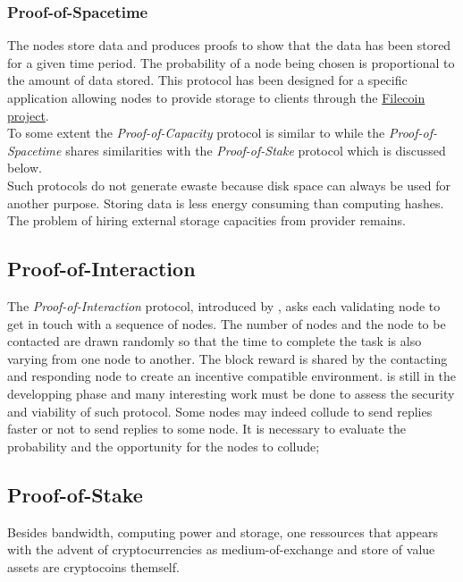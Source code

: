 \subsubsection{Proof-of-Spacetime}
The nodes store data and produces proofs to show that the data has been stored for a given time period. The probability of a node being chosen is proportional to the amount of data stored. This protocol has been designed for a specific application allowing nodes to provide storage to clients through the \href{https://filecoin.io/}{Filecoin project}.\\

\noindent To some extent the \textit{Proof-of-Capacity} protocol is similar to \PoW while the \textit{Proof-of-Spacetime} shares similarities with the \textit{Proof-of-Stake} protocol which is discussed below.\\

\noindent Such protocols do not generate ewaste because disk space can always be used for another purpose. Storing data is less energy consuming than computing hashes. The problem of hiring external storage capacities from provider remains.
\subsection{Proof-of-Interaction}\label{ssec:poi}
The \textit{Proof-of-Interaction} protocol, introduced by \citet{Abegg2021}, asks each validating node to get in touch with a sequence of nodes. The number of nodes and the node to be contacted are drawn randomly so that the time to complete the task is also varying from one node to another. The block reward is shared by the contacting and responding node to create an incentive compatible environment. \PoI is still in the developping phase and many interesting work must be done to assess the security and viability of such protocol. Some nodes may indeed collude to send replies faster or not to send replies to some node. It is necessary to evaluate the probability and the opportunity for the nodes to collude;
\subsection{Proof-of-Stake}\label{ssec:pos}
Besides bandwidth, computing power and storage, one ressources that appears with the advent of cryptocurrencies as medium-of-exchange and store of value assets are cryptocoins themself.

